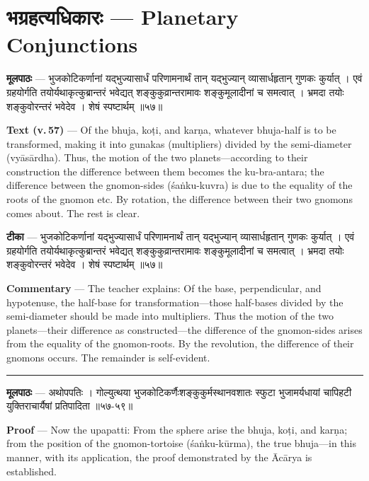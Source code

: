 \documentclass[11pt,a4paper]{article}
\newcommand{\dev}[1]{{\devanagarifont #1}}
\newcommand{\skt}[1]{{\devanagarifont\color{sktcolor} #1}}
\newenvironment{bilingual}{%
  \par\noindent
  \begin{minipage}[t]{0.47\textwidth}%
}{%
  \par\end{minipage}%
}
\newcommand{\rightcol}{%
  \par\end{minipage}%
  \hfill
  \begin{minipage}[t]{0.47\textwidth}%
}
\begin{document}
\newpage
\section[\dev{भग्रहत्यधिकारः}]{\dev{भग्रहत्यधिकारः} --- Planetary Conjunctions}

\begin{bilingual}
\textbf{मूलपाठः} --- \skt{भुजकोटिकर्णानां यद्भुज्यासार्धं परिणामनार्थं तान् यद्भुज्यान् व्यासार्धहृतान् गुणकः कुर्यात्} । एवं ग्रहयोर्गति तयोर्यथाकृत्कुब्रान्तरं भवेद्यत् शङ्कुकुव्रान्तरामावः शङ्कुमूलादीनां च समत्वात् । भ्रमदा तयोः शङ्कुवोरन्तरं भवेदेव । शेषं स्पष्टार्थम् ॥५७॥
\rightcol
\textbf{Text (v.\,57)} --- Of the bhuja, koṭi, and karṇa, whatever bhuja-half is to be transformed, making it into gunakas (multipliers) divided by the semi-diameter (vyāsārdha). Thus, the motion of the two planets---according to their construction the difference between them becomes the ku-bra-antara; the difference between the gnomon-sides (śaṅku-kuvra) is due to the equality of the roots of the gnomon etc. By rotation, the difference between their two gnomons comes about. The rest is clear.
\end{bilingual}

\medskip

\begin{bilingual}
\textbf{टीका} --- \skt{भुजकोटिकर्णानां यद्भुज्यासार्धं परिणामनार्थं तान् यद्भुज्यान् व्यासार्धहृतान् गुणकः कुर्यात्} । एवं ग्रहयोर्गति तयोर्यथाकृत्कुब्रान्तरं भवेद्यत् शङ्कुकुव्रान्तरामावः शङ्कुमूलादीनां च समत्वात् । भ्रमदा तयोः शङ्कुवोरन्तरं भवेदेव । शेषं स्पष्टार्थम् ॥५७॥
\rightcol
\textbf{Commentary} --- The teacher explains: Of the base, perpendicular, and hypotenuse, the half-base for transformation---those half-bases divided by the semi-diameter should be made into multipliers. Thus the motion of the two planets---their difference as constructed---the difference of the gnomon-sides arises from the equality of the gnomon-roots. By the revolution, the difference of their gnomons occurs. The remainder is self-evident.
\end{bilingual}

\medskip
\noindent\rule{\textwidth}{0.4pt}

\begin{bilingual}
\textbf{मूलपाठः} --- \skt{अथोपपतिः । गोल्युत्थया भुजकोटिकर्णैःशङ्कुकुर्मस्थानवशातः स्फुटा भुजामर्यधायां चापिहटी युक्तिराचार्यैषां प्रतिपादिता} ॥५७-५९॥
\rightcol
\textbf{Proof} --- Now the upapatti: From the sphere arise the bhuja, koṭi, and karṇa; from the position of the gnomon-tortoise (śaṅku-kūrma), the true bhuja---in this manner, with its application, the proof demonstrated by the Ācārya is established.
\end{bilingual}
\end{document}

